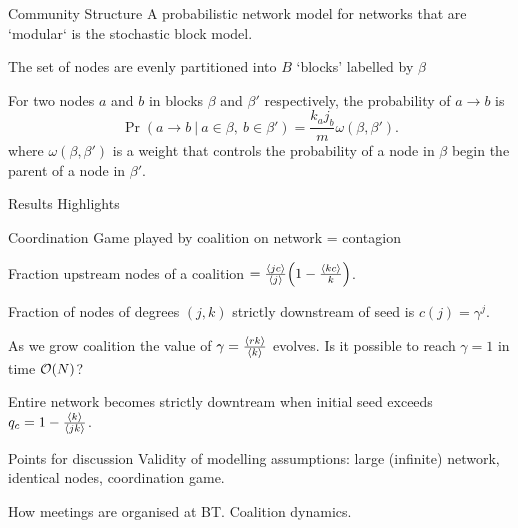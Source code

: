 \documentclass[10pt]{beamer}
\begin{document}
\begin{frame}{Community Structure}
A probabilistic network model for networks that are `modular` is the stochastic block model.

The set of nodes are evenly partitioned into $B$ `blocks' labelled by $\beta$

For two nodes $a$ and $b$ in blocks $\beta$ and $\beta '$ respectively, the probability of $a \to b$ is
\begin{equation}
\Pr(a \to b \ \lvert \ a \in \beta,\ b \in \beta ') = \frac{k_a j_b}{m}\omega(\beta, \beta ').
\end{equation}
where $\omega(\beta, \beta')$ is a weight that controls the probability of a node in $\beta$ begin the parent of a node in $\beta'$.



\end{frame}

\begin{frame}{Results Highlights}

Coordination Game played by coalition on network = contagion

Fraction upstream nodes of a coalition $= \frac{\expval{jc}}{\expval{j}}\qty(1 - \frac{\expval{kc}}{k})$.

Fraction of nodes of degrees $(j,k)$ strictly downstream of seed is $c(j) = \gamma^j$.

As we grow coalition the value of $\gamma = \frac{\expval{rk}}{\expval{k}}$ evolves. Is it possible to reach $\gamma = 1$ in time $\order{N}$?

Entire network becomes strictly downtream when initial seed exceeds $q_c = 1 - \frac{\expval{k}}{\expval{jk}}$.

\end{frame}

\begin{frame}{Points for discussion}
Validity of modelling assumptions: large (infinite) network, identical nodes, coordination game.

How meetings are organised at BT. Coalition dynamics.

\end{frame}
\end{document}
